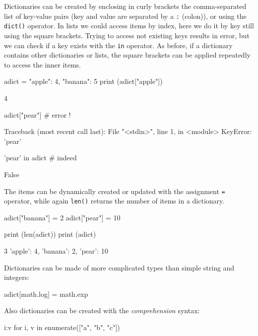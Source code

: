 \begin{ipythonnon}
Dictionaries can be created by enclosing in curly brackets the comma-separated list of key-value pairs (key and value are separated by a \texttt{:} (colon)), or using the \texttt{dict()} operator. In lists we could access items by index, here we do it by key still using the square brackets. Trying to access not existing keys results in error, but we can check if a key exists with the \texttt{in} operator. As before, if a dictionary contains other dictionaries or lists, the square brackets can be applied repeatedly to access the inner items.

\begin{ipythonnon}
adict = {"apple": 4, "banana": 5}
print (adict["apple"])
\end{ipythonnon}
\begin{ioutput}
4
\end{ioutput}

\begin{ipythonnon}
adict["pear"] # error !
\end{ipythonnon}
\begin{ioutput}
Traceback (most recent call last):
  File "<stdin>", line 1, in <module>
KeyError: 'pear'
\end{ioutput}

\begin{ipythonnon}
'pear' in adict # indeed
\end{ipythonnon}
\begin{ioutput}
False
\end{ioutput}

The items can be dynamically created or updated with the assignment \texttt{=} operator, while again \texttt{len()} returns the number of items in a dictionary.

\begin{ipythonnon}
adict["banana"] = 2
adict["pear"] = 10

print (len(adict))
print (adict)
\end{ipythonnon}
\begin{ioutput}
3
{'apple': 4, 'banana': 2, 'pear': 10}
\end{ioutput}

Dictionaries can be made of more complicated types than simple string and integers:

\begin{ipythonnon}
adict[math.log] = math.exp
\end{ipythonnon}

Also dictionaries can be created with the \emph{comprehension} syntax:
\begin{ipythonnon}
{i:v for i, v in enumerate(["a", "b", "c"])}	
\end{ipythonnon}


\end{ipythonnon}
